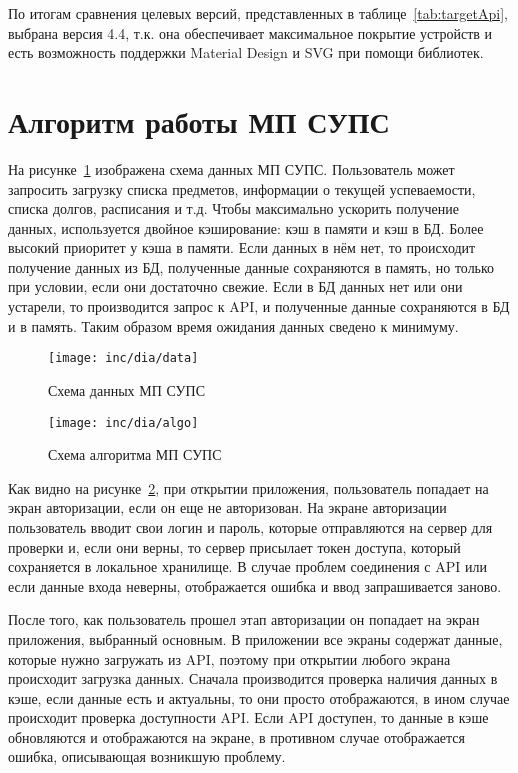 По итогам сравнения целевых версий, представленных в таблице~\ref{tab:targetApi}, выбрана версия 4.4, т.к. она обеспечивает максимальное покрытие устройств и есть возможность поддержки Material Design и SVG при помощи библиотек.

\section{Алгоритм работы МП СУПС}
\label{sec:algo}

На рисунке~\ref{fig:data} изображена схема данных МП СУПС.
Пользователь может запросить загрузку списка предметов, информации о текущей успеваемости, списка долгов, расписания и т.д.
Чтобы максимально ускорить получение данных, используется двойное кэширование: кэш в памяти и кэш в БД.
Более высокий приоритет у кэша в памяти.
Если данных в нём нет, то происходит получение данных из БД, полученные данные сохраняются в память, но только при условии, если они достаточно свежие.
Если в БД данных нет или они устарели, то производится запрос к API, и полученные данные сохраняются в БД и в память.
Таким образом время ожидания данных сведено к минимуму.

\begin{figure}[H]
  \texttt{[image: inc/dia/data]}
  \caption{Схема данных МП СУПС}
  \label{fig:data}
\end{figure}

\begin{figure}[ht]
  \texttt{[image: inc/dia/algo]}
  \caption{Схема алгоритма МП СУПС}
  \label{fig:algo}
\end{figure}

Как видно на рисунке~\ref{fig:algo}, при открытии приложения, пользователь попадает на экран авторизации, если он еще не авторизован.
На экране авторизации пользователь вводит свои логин и пароль, которые отправляются на сервер для проверки и, если они верны, то сервер присылает токен доступа, который сохраняется в локальное хранилище.
В случае проблем соединения с API или если данные входа неверны, отображается ошибка и ввод запрашивается заново.

После того, как пользователь прошел этап авторизации он попадает на экран приложения, выбранный основным.
В приложении все экраны содержат данные, которые нужно загружать из API, поэтому при открытии любого экрана происходит загрузка данных.
Сначала производится проверка наличия данных в кэше, если данные есть и актуальны, то они просто отображаются, в ином случае происходит проверка доступности API\@.
Если API доступен, то данные в кэше обновляются и отображаются на экране, в противном случае отображается ошибка, описывающая возникшую проблему.

